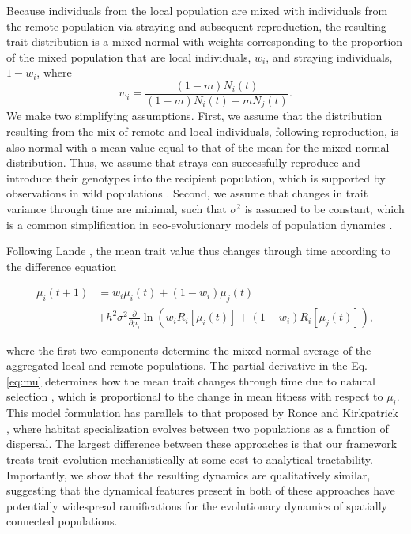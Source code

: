 \documentclass{revtex4}
\begin{document}
\noindent Because individuals from the local population are mixed with individuals from the remote population via straying and subsequent reproduction, the resulting trait distribution is a mixed normal with weights corresponding to the proportion of the mixed population that are local individuals, $w_i$, and straying individuals, $1-w_i$, where 
\begin{equation}
w_i=\frac{(1-m)N_i(t)}{(1-m) N_i(t) + m N_j(t)}.
\end{equation}
We make two simplifying assumptions.
First, we assume that the distribution resulting from the mix of remote and local individuals, following reproduction, is also normal with a mean value equal to that of the mean for the mixed-normal distribution.
Thus, we assume that strays can successfully reproduce and introduce their genotypes into the recipient population, which is supported by observations in wild populations \citep{Jasper:2013cc}.
Second, we assume that changes in trait variance through time are minimal, such that $\sigma^2$ is assumed to be constant, which is a common simplification in eco-evolutionary models of population dynamics \citep{Lande:1976ga,Schreiber:2011wx,Gilbert:2014ee,Gibert:2015kc}.



Following Lande \citep{Lande:1976ga}, the mean trait value thus changes through time according to the difference equation

\begin{align}
  \label{eq:mu}
  \mu_i(t+1) &= w_i\mu_i(t) + (1-w_i)\mu_j(t) \\ \nonumber
  &+ h^2\sigma^2\frac{\partial}{\partial \mu_i}\ln\left(w_i R_i[\mu_i(t)] + (1-w_i)R_i[\mu_j(t)]  \right),
\end{align}

\noindent where the first two components determine the mixed normal average of the aggregated local and remote populations.
The partial derivative in the Eq. \ref{eq:mu} determines how the mean trait changes through time due to natural selection \citep{Lande:1976ga}, which is proportional to the change in mean fitness with respect to $\mu_i$.
This model formulation has parallels to that proposed by Ronce and Kirkpatrick \citep{Ronce:2001dp}, where habitat specialization evolves between two populations as a function of dispersal.
The largest difference between these approaches is that our framework treats trait evolution mechanistically at some cost to analytical tractability.
Importantly, we show that the resulting dynamics are qualitatively similar, suggesting that the dynamical features present in both of these approaches have potentially widespread ramifications for the evolutionary dynamics of spatially connected populations.
\\
\end{document}
